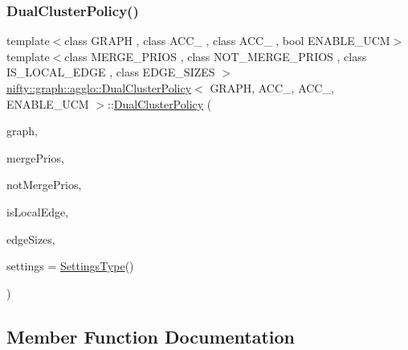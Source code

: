 \subsubsection{\texorpdfstring{Dual\+Cluster\+Policy()}{DualClusterPolicy()}}
{\footnotesize\ttfamily template$<$class G\+R\+A\+PH , class A\+C\+C\+\_ , class A\+C\+C\+\_ , bool E\+N\+A\+B\+L\+E\+\_\+\+U\+CM$>$ \\
template$<$class M\+E\+R\+G\+E\+\_\+\+P\+R\+I\+OS , class N\+O\+T\+\_\+\+M\+E\+R\+G\+E\+\_\+\+P\+R\+I\+OS , class I\+S\+\_\+\+L\+O\+C\+A\+L\+\_\+\+E\+D\+GE , class E\+D\+G\+E\+\_\+\+S\+I\+Z\+ES $>$ \\
\hyperlink{classnifty_1_1graph_1_1agglo_1_1DualClusterPolicy}{nifty\+::graph\+::agglo\+::\+Dual\+Cluster\+Policy}$<$ G\+R\+A\+PH, A\+C\+C\+\_, A\+C\+C\+\_, E\+N\+A\+B\+L\+E\+\_\+\+U\+CM $>$\+::\hyperlink{classnifty_1_1graph_1_1agglo_1_1DualClusterPolicy}{Dual\+Cluster\+Policy} (\begin{DoxyParamCaption}\item[{const \hyperlink{classnifty_1_1graph_1_1agglo_1_1DualClusterPolicy_ad8e19fe87ad08f4187fdb79c1367389a}{Graph\+Type} \&}]{graph,  }\item[{const M\+E\+R\+G\+E\+\_\+\+P\+R\+I\+OS \&}]{merge\+Prios,  }\item[{const N\+O\+T\+\_\+\+M\+E\+R\+G\+E\+\_\+\+P\+R\+I\+OS \&}]{not\+Merge\+Prios,  }\item[{const I\+S\+\_\+\+L\+O\+C\+A\+L\+\_\+\+E\+D\+GE \&}]{is\+Local\+Edge,  }\item[{const E\+D\+G\+E\+\_\+\+S\+I\+Z\+ES \&}]{edge\+Sizes,  }\item[{const \hyperlink{structnifty_1_1graph_1_1agglo_1_1DualClusterPolicy_1_1SettingsType}{Settings\+Type} \&}]{settings = {\ttfamily \hyperlink{structnifty_1_1graph_1_1agglo_1_1DualClusterPolicy_1_1SettingsType}{Settings\+Type}()} }\end{DoxyParamCaption})\hspace{0.3cm}{\ttfamily [inline]}}



\subsection{Member Function Documentation}
\mbox{\label{classnifty_1_1graph_1_1agglo_1_1DualClusterPolicy_a7e137da249efd061a846fb73a4d642ab}} 
